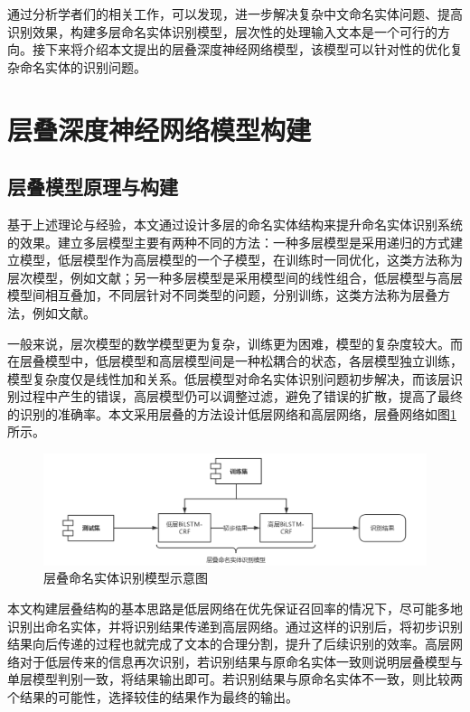 \documentclass[winfonts,master,oneside,nobackinfo]{njuthesis}
\begin{document}
通过分析学者们的相关工作，可以发现，进一步解决复杂中文命名实体问题、提高识别效果，构建多层命名实体识别模型，层次性的处理输入文本是一个可行的方向。接下来将介绍本文提出的层叠深度神经网络模型，该模型可以针对性的优化复杂命名实体的识别问题。

\section{层叠深度神经网络模型构建}

\subsection{层叠模型原理与构建}

基于上述理论与经验，本文通过设计多层的命名实体结构来提升命名实体识别系统的效果。建立多层模型主要有两种不同的方法：一种多层模型是采用递归的方式建立模型，低层模型作为高层模型的一个子模型，在训练时一同优化，这类方法称为层次模型，例如文献\cite{taobao}；另一种多层模型是采用模型间的线性组合，低层模型与高层模型间相互叠加，不同层针对不同类型的问题，分别训练，这类方法称为层叠方法，例如文献\cite{Yixue,Jia}。

一般来说，层次模型的数学模型更为复杂，训练更为困难，模型的复杂度较大。而在层叠模型中，低层模型和高层模型间是一种松耦合的状态，各层模型独立训练，模型复杂度仅是线性加和关系。低层模型对命名实体识别问题初步解决，而该层识别过程中产生的错误，高层模型仍可以调整过滤，避免了错误的扩散，提高了最终的识别的准确率。本文采用层叠的方法设计低层网络和高层网络，层叠网络如图\ref{casecaed-model}所示。

\begin{figure}[H]
\centering
\includegraphics[width=1\textwidth]{./figure/层叠模型.jpg}
\caption{层叠命名实体识别模型示意图}
\label{casecaed-model}
\end{figure}

本文构建层叠结构的基本思路是低层网络在优先保证召回率的情况下，尽可能多地识别出命名实体，并将识别结果传递到高层网络。通过这样的识别后，将初步识别结果向后传递的过程也就完成了文本的合理分割，提升了后续识别的效率。高层网络对于低层传来的信息再次识别，若识别结果与原命名实体一致则说明层叠模型与单层模型判别一致，将结果输出即可。若识别结果与原命名实体不一致，则比较两个结果的可能性，选择较佳的结果作为最终的输出。
\end{document}

